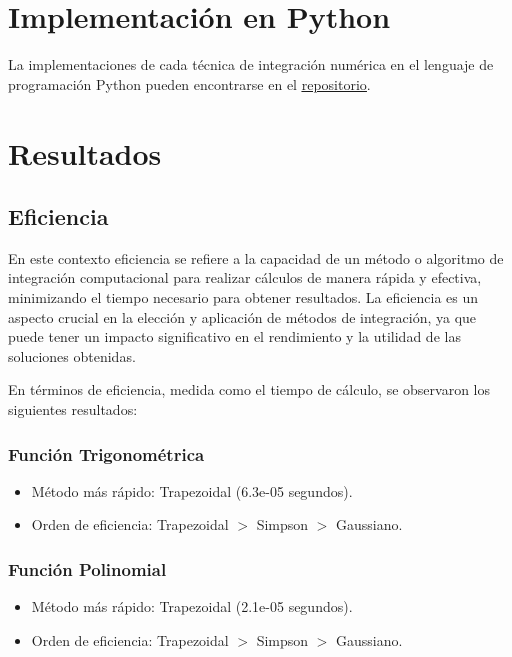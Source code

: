 \documentclass[a4paper]{article}
\begin{document}
    \section{Implementación en Python}
	\label{sec:python}
    La implementaciones de cada técnica de integración numérica en el lenguaje de 
    programación Python pueden encontrarse en el \underline{\href{https://github.com/nicolasgomeza7/tecnicasIntegracion}{repositorio}}.
    
    \section{Resultados}    
    
    \subsection{Eficiencia}

    En este contexto eficiencia se refiere a la capacidad de un método o algoritmo de integración computacional para realizar cálculos de manera rápida y efectiva, minimizando el tiempo necesario para obtener resultados. La eficiencia es un aspecto crucial en la elección y aplicación de métodos de integración, ya que puede tener un impacto significativo en el rendimiento y la utilidad de las soluciones obtenidas.
    
    En términos de eficiencia, medida como el tiempo de cálculo, se observaron los siguientes resultados:
    
   \subsubsection{Función Trigonométrica}
    \begin{itemize}
        \item Método más rápido: Trapezoidal (6.3e-05 segundos).
        \item Orden de eficiencia: Trapezoidal $>$ Simpson $>$ Gaussiano.
    \end{itemize}
    
    \subsubsection{Función Polinomial}
    \begin{itemize}
        \item Método más rápido: Trapezoidal (2.1e-05 segundos).
        \item Orden de eficiencia: Trapezoidal $>$ Simpson $>$ Gaussiano.
    \end{itemize}
    
\end{document}
